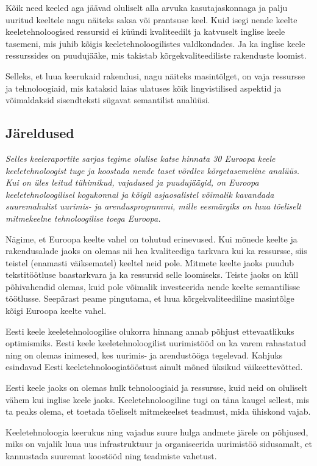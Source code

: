 \begin{multicols}{2}
Kõik need keeled aga jäävad oluliselt alla arvuka kasutajaskonnaga ja palju uuritud keeltele nagu näiteks saksa või prantsuse keel.
Kuid isegi nende keelte keeletehnoloogised ressursid ei küündi kvaliteedilt ja katvuselt inglise keele tasemeni, mis juhib kõigis keeletehnoloogilistes valdkondades.
Ja ka inglise keele ressurssides on puudujääke, mis takistab kõrgekvaliteediliste rakenduste loomist.

Selleks, et luua keerukaid rakendusi, nagu näiteks masintõlget, on vaja ressursse ja tehnoloogiaid, mis kataksid laias ulatuses kõik lingvistilised aspektid ja võimaldaksid sisendteksti sügavat semantilist analüüsi.

\subsection{Järeldused}

\emph{Selles keeleraportite sarjas tegime olulise katse hinnata 30 Euroopa keele keeletehnoloogist tuge ja koostada nende taset võrdlev kõrgetasemeline analüüs.
Kui on üles leitud tühimikud, vajadused ja puudujäägid, on Euroopa keeletehnoloogilisel kogukonnal ja kõigil asja\-osalistel võimalik kavandada suuremahulist uurimis- ja arendusprogrammi, mille eesmärgiks on luua tõeliselt mitmekeelne tehnoloogilise toega Euroopa.}


Nägime, et Euroopa keelte vahel on tohutud erinevused. 
Kui mõnede keelte ja rakendusalade jaoks on olemas nii hea kvaliteediga tarkvara kui ka ressursse, siis teistel (enamasti väiksematel) keeltel neid pole. 
Mitmete keelte jaoks puudub tekstitöötluse baastarkvara ja ka ressursid selle loomiseks. 
Teiste jaoks on küll põhivahendid olemas, kuid pole võimalik investeerida nende keelte semantilisse töötlusse. 
Seepärast peame pingutama, et luua kõrgekvaliteediline masintõlge kõigi Euroopa keelte vahel. 

Eesti keele keeletehnoloogilise olukorra hinnang annab põhjust ettevaatlikuks optimismiks. 
Eesti keele keeletehnoloogilist uurimistööd on ka varem rahastatud ning on olemas inimesed, kes uurimis- ja arendustööga tegelevad. 
Kahjuks esindavad Eesti keeletehnoloogiatööstust ainult mõned üksikud väikeettevõtted.

Eesti keele jaoks on olemas hulk tehnoloogiaid ja ressursse, kuid neid on oluliselt vähem kui inglise keele jaoks. 
Keeletehnoloogiline tugi on täna kaugel sellest, mis ta peaks olema, et toetada tõeliselt mitmekeelset teadmust, mida ühiskond vajab.

Keeletehnoloogia keerukus ning vajadus suure hulga andmete järele on põhjused, miks on vajalik luua uus infrastruktuur ja organiseerida uurimistöö sidusamalt, et kannustada suuremat koostööd ning teadmiste vahetust.


\end{multicols}
